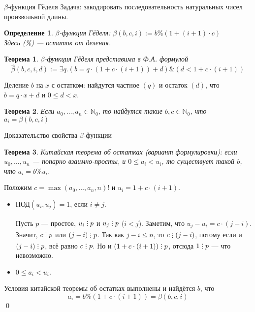 \documentclass[aspectratio=169]{beamer}
\newtheorem{thm}{Теорема}[section]
\newtheorem{dfn}{Определение}[section]
\newcommand{\divisible}%
{\mathrel{\lower.2ex%
\vbox{\baselineskip=0.7ex\lineskiplimit=0pt%
\kern6pt \hbox{.}\hbox{.}\hbox{.}}%
}}
\begin{document}
\begin{frame}{$\beta$-функция Гёделя}
Задача: закодировать последовательность натуральных чисел произвольной длины.\pause
\begin{dfn}$\beta$-функция Гёделя: $\mathcal{\beta}(b,c,i) := b \% (1 + (i+1) \cdot c)$\\
Здесь (\%) --- остаток от деления.
\end{dfn}\pause
\begin{thm}$\beta$-функция Гёделя представима в Ф.А. формулой
$$\hat{\beta}(b,c,i,d) := \exists q.(b = q \cdot (1 + c \cdot (i+1)) + d) \& (d < 1 + c \cdot (i+1))$$
\end{thm}\pause\vspace{-0.3cm}
Деление $b$ на $x$ с остатком: найдутся частное $(q)$ и остаток $(d)$, что
$b = q\cdot x + d$ и $0 \le d < x$.
\pause
\begin{thm}Если $a_0, \dots, a_n \in \mathbb{N}_0$, то найдутся такие $b,c \in \mathbb{N}_0$, что
$a_i = \beta(b,c,i)$
\end{thm}
\end{frame}

\begin{frame}{Доказательство свойства $\beta$-функции}
\begin{thm}Китайская теорема об остатках (вариант формулировки): если $u_0, \dots, u_n$ --- попарно
взаимно-просты, и $0 \le a_i < u_i$, то существует такой $b$, что $a_i = b \% u_i$.
\end{thm}\pause
Положим $c = \max(a_0,\dots,a_n,n)!$ и $u_i = 1+c\cdot(i+1)$.\pause
\begin{itemize}
\item $\text{НОД}(u_i,u_j) = 1$, если $i \ne j$.\pause

Пусть $p$ --- простое, $u_i\divisible p$ и $u_j\divisible p$ ($i < j$). \pause
Заметим, что $u_j-u_i = c \cdot (j-i)$. Значит, $c\divisible p$ или $(j-i)\divisible p$. \pause
Так как $j-i \le n$, то $c \divisible (j-i)$, потому если и $(j-i)\divisible p$, всё равно $c \divisible p$. \pause
Но и $(1+c\cdot(i+1))\divisible p$, отсюда $1 \divisible p$ --- что невозможно. \pause
\item $0 \le a_i < u_i$.\pause
\end{itemize}
Условия китайской теоремы об остатках выполнены и найдётся $b$, что \vspace{-0.2cm}
$$a_i = b \% (1 + c\cdot(i+1)) = \beta(b,c,i)$$
\qed
\end{frame}
\end{document}
